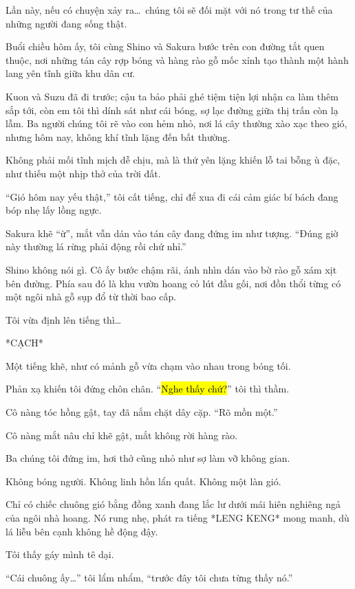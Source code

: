\documentclass[../main.tex]{subfiles}
\begin{document}
Lần này, nếu có chuyện xảy ra\dots\ chúng tôi sẽ đối mặt với nó trong tư thế của những người đang sống thật.

\ct

Buổi chiều hôm ấy, tôi cùng Shino và Sakura bước trên con đường tắt quen thuộc, nơi những tán cây rợp bóng và hàng rào gỗ mốc xỉnh tạo thành một hành lang yên tĩnh giữa khu dân cư.

Kuon và Suzu đã đi trước; cậu ta bảo phải ghé tiệm tiện lợi nhận ca làm thêm sắp tới, còn em tôi thì dính sát như cái bóng, sợ lạc đường giữa thị trấn còn lạ lẫm. Ba người chúng tôi rẽ vào con hẻm nhỏ, nơi lá cây thường xào xạc theo gió, nhưng hôm nay, không khí tĩnh lặng đến bất thường.

Không phải mối tĩnh mịch dễ chịu, mà là thứ yên lặng khiến lỗ tai bỗng ù đặc, như thiếu một nhịp thở của trời đất.

``Gió hôm nay yếu thật,'' tôi cất tiếng, chỉ để xua đi cái cảm giác bí bách đang bóp nhẹ lấy lồng ngực.

Sakura khẽ ``ừ'', mắt vẫn dán vào tán cây đang đứng im như tượng. ``Đúng giờ này thường lá rừng phải động rồi chứ nhỉ.''

Shino không nói gì. Cô ấy bước chậm rãi, ánh nhìn dán vào bờ rào gỗ xám xịt bên đường. Phía sau đó là khu vườn hoang cỏ lút đầu gối, nơi đồn thổi từng có một ngôi nhà gỗ sụp đổ từ thời bao cấp.

Tôi vừa định lên tiếng thì\dots

*CẠCH*

Một tiếng khẽ, như có mảnh gỗ vừa chạm vào nhau trong bóng tối.

Phản xạ khiến tôi đứng chôn chân. ``\hl{Nghe thấy chứ?}'' tôi thì thầm.

Cô nàng tóc hồng gật, tay đã nắm chặt dây cặp. ``Rõ mồn một.''

Cô  nàng mắt nâu chỉ khẽ gật, mắt không rời hàng rào.

Ba chúng tôi đứng im, hơi thở cũng nhỏ như sợ làm vỡ không gian.

Không bóng người.
Không linh hồn lẩn quất.
Không một làn gió.

Chỉ có chiếc chuông gió bằng đồng xanh đang lắc lư dưới mái hiên nghiêng ngả của ngôi nhà hoang. Nó rung nhẹ, phát ra tiếng *LENG KENG* mong manh, dù lá liễu bên cạnh không hề động đậy.

Tôi thấy gáy mình tê dại.

``Cái chuông ấy\dots'' tôi lẩm nhẩm, ``trước đây tôi chưa từng thấy nó.''
\end{document}
